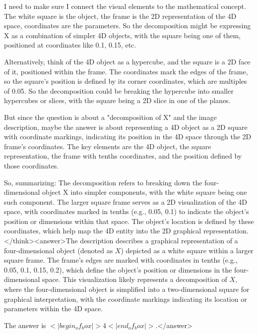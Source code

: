 I need to make sure I connect the visual elements to the mathematical concept. The white square is the object, the frame is the 2D representation of the 4D space, coordinates are the parameters. So the decomposition might be expressing X as a combination of simpler 4D objects, with the square being one of them, positioned at coordinates like 0.1, 0.15, etc.

Alternatively, think of the 4D object as a hypercube, and the square is a 2D face of it, positioned within the frame. The coordinates mark the edges of the frame, so the square's position is defined by its corner coordinates, which are multiples of 0.05. So the decomposition could be breaking the hypercube into smaller hypercubes or slices, with the square being a 2D slice in one of the planes.

But since the question is about a "decomposition of X" and the image description, maybe the answer is about representing a 4D object as a 2D square with coordinate markings, indicating its position in the 4D space through the 2D frame's coordinates. The key elements are the 4D object, the square representation, the frame with tenths coordinates, and the position defined by those coordinates.

So, summarizing: The decomposition refers to breaking down the four-dimensional object X into simpler components, with the white square being one such component. The larger square frame serves as a 2D visualization of the 4D space, with coordinates marked in tenths (e.g., 0.05, 0.1) to indicate the object's position or dimensions within that space. The object's location is defined by these coordinates, which help map the 4D entity into the 2D graphical representation.</think><answer>The description describes a graphical representation of a four-dimensional object (denoted as \( X \)) depicted as a white square within a larger square frame. The frame’s edges are marked with coordinates in tenths (e.g., 0.05, 0.1, 0.15, 0.2), which define the object’s position or dimensions in the four-dimensional space. This visualization likely represents a decomposition of \( X \), where the four-dimensional object is simplified into a two-dimensional square for graphical interpretation, with the coordinate markings indicating its location or parameters within the 4D space.  

The answer is \(<|begin_of_box|>4<|end_of_box|>\).</answer>